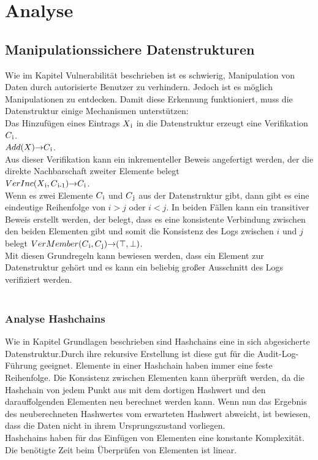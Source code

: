 \chapter{Analyse}

\section{Manipulationssichere Datenstrukturen}
Wie im Kapitel Vulnerabilität beschrieben ist es schwierig, Manipulation von Daten durch autorisierte Benutzer zu verhindern. Jedoch ist es möglich Manipulationen zu entdecken. Damit diese Erkennung funktioniert, muss die Datenstruktur einige Mechanismen unterstützen: \\
Das Hinzufügen eines Eintrags $X\textsubscript{i}$ in die Datenstruktur erzeugt eine Verifikation $C\textsubscript{i}$.\\
$Add(X) {\rightarrow} C\textsubscript{i}$.\\
Aus dieser Verifikation kann ein inkrementeller Beweis angefertigt werden, der die direkte Nachbarschaft zweiter Elemente belegt \\
$VerInc(X\textsubscript{i}, C\textsubscript{i-1}) {\rightarrow} C\textsubscript{i}$. \\
Wenn es zwei Elemente $C\textsubscript{i}$ und $C\textsubscript{j}$ aus der Datenstruktur gibt, dann gibt es eine eindeutige Reihenfolge von $i > j$ oder $i < j$. In beiden Fällen kann ein transitiver Beweis erstellt werden, der belegt, dass es eine konsistente Verbindung zwischen den beiden Elementen gibt und somit die Konsistenz des Logs zwischen $i$ und $j$ belegt $VerMember(C\textsubscript{i}, C\textsubscript{j}) {\rightarrow} ({\top},{\perp})$. \\
Mit diesen Grundregeln kann bewiesen werden, dass ein Element zur Datenstruktur gehört und es kann ein beliebig großer Ausschnitt des Logs verifiziert werden. \cite{8280477}\\
\\
\subsection{Analyse Hashchains}
Wie in Kapitel Grundlagen beschrieben sind Hashchains eine in sich abgesicherte Datenstruktur.Durch ihre rekursive Erstellung ist diese gut für die Audit-Log-Führung geeignet. Elemente in einer Hashchain haben immer eine feste Reihenfolge. Die Konsistenz zwischen Elementen kann überprüft werden, da die Hashchain von jedem Punkt aus mit dem dortigen Hashwert und den darauffolgenden Elementen neu berechnet werden kann. Wenn nun das Ergebnis des neuberechneten Hashwertes vom erwarteten Hashwert abweicht, ist bewiesen, dass die Daten nicht in ihrem Ursprungszustand vorliegen. \\
Hashchains haben für das Einfügen von Elementen eine konstante Komplexität. Die benötigte Zeit beim Überprüfen von Elementen ist linear.\cite[S.351ff]{40322788} \\
\\
